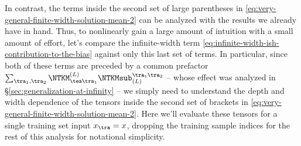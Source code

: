In contrast, the terms inside the second set of large parentheses in \eqref{eq:very-general-finite-width-solution-mean-2}
can be analyzed with the results we already have in hand.
Thus, to nonlinearly gain a large amount of intuition with a small amount of effort, let's compare the infinite-width term \eqref{eq:infinite-width-ish-contribution-to-the-bias} against only this last set of terms. In particular, since both of these terms are preceded by a common prefactor $\sum_{\tra_1,\tra_2}\NTKM^{(L)}_{\tea\tra_1}\NTKMsub_{(L)}^{\tra_1\tra_2}$
-- whose effect was analyzed in \S\ref{sec:generalization-at-infinity} --
we simply need to understand the depth and width dependence of the tensors inside the second set of brackets in \eqref{eq:very-general-finite-width-solution-mean-2}. Here we'll evaluate these tensors for a single training set input $x_{\tra}=x$, dropping the training sample indices for the rest of this analysis for notational simplicity. 

